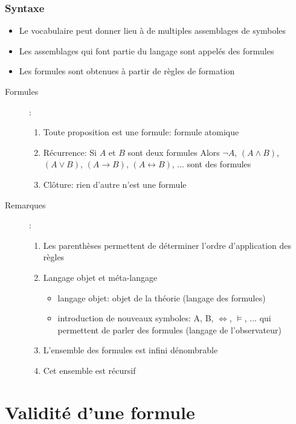 \documentclass[10pt,a4paper]{article}
\begin{document}
		\subsubsection{Syntaxe}
			\begin{itemize}
				\item Le vocabulaire peut donner lieu à de multiples assemblages de symboles
				\item Les assemblages qui font partie du langage sont appelés des formules
				\item Les formules sont obtenues à partir de règles de formation
			\end{itemize}
			\begin{description}
				\item[Formules]:
				\begin{enumerate}
					\item Toute proposition est une formule: formule atomique
					\item Récurrence: Si $A$ et $B$ sont deux formules Alors $\neg A$, $(A\wedge B)$, $(A\vee B)$, $(A\rightarrow B)$, $(A\leftrightarrow B)$, ... sont des formules
					\item Clôture: rien d'autre n'est une formule
				\end{enumerate}
				\item[Remarques]:
				\begin{enumerate}
					\item Les parenthèses permettent de déterminer l'ordre d'application des règles
					\item Langage objet et méta-langage
					\begin{itemize}
						\item langage objet: objet de la théorie (langage des formules)
						\item introduction de nouveaux symboles: A, B, $\Leftrightarrow$, $\vDash$, ... qui permettent de parler des formules (langage de l'observateur)
					\end{itemize}
					\item L'ensemble des formules est infini dénombrable
					\item Cet ensemble est récursif
				\end{enumerate}
			\end{description}
\section{Validité d'une formule}
\end{document}
